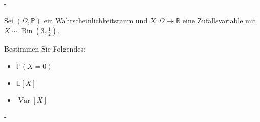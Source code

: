 \documentclass{article}
\begin{document}
\begin{solution}
-
\end{solution}

\newpage

\begin{problem}
Sei $(\Omega, \mathbb{P})$ ein Wahrscheinlichkeitsraum und $X: \Omega \to \mathbb{R}$ eine Zufallsvariable mit $X \sim \operatorname{Bin} \left( 3, \frac{1}{2} \right)$.
\par
Bestimmen Sie Folgendes:
\begin{itemize}
\item $\mathbb{P}(X = 0)$
\item $\mathbb{E}[X]$
\item $\operatorname{Var}[X]$
\end{itemize}
\end{problem}

\begin{solution}
-
\end{solution}
\end{document}
